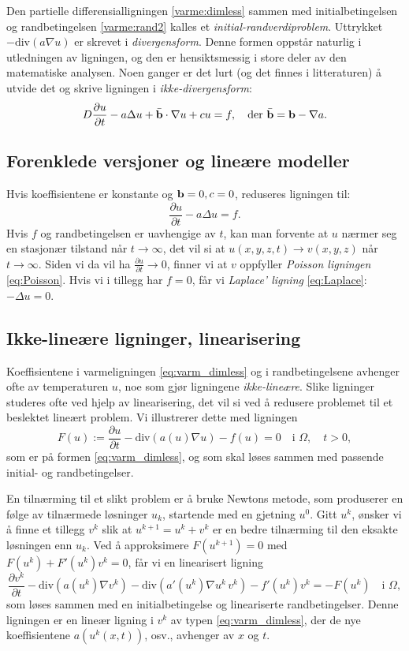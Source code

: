 Den partielle differensialligningen \eqref{varme:dimless} sammen med initialbetingelsen og randbetingelsen \eqref{varme:rand2} kalles et \emph{initial-randverdiproblem}. Uttrykket \( -\text{div} (a \nabla u) \) er skrevet i \emph{divergensform}. Denne formen oppstår naturlig i utledningen av ligningen, og den er hensiktsmessig i store deler av den matematiske analysen. Noen ganger er det lurt (og det finnes i litteraturen) å utvide det og skrive ligningen i \emph{ikke-divergensform}:
\[
D \frac{\partial u}{\partial t} - a \Delta u + \bar{\mathbf{b}} \cdot \nabla u + c u = f, \quad \text{der } \bar{\mathbf{b}} = \mathbf{b} - \nabla a.
\]

\subsection*{Forenklede versjoner og lineære modeller}
Hvis koeffisientene er konstante og \( \mathbf{b} = 0, c = 0 \), reduseres ligningen til:
\[
\frac{\partial u}{\partial t} - a \Delta u = f.
\]
Hvis \( f \) og randbetingelsen er uavhengige av \( t \), kan man forvente at \( u \) nærmer seg en stasjonær tilstand når \( t \to \infty \), det vil si at \( u(x,y,z, t) \to v(x,y,z) \) når \( t \to \infty \).  
Siden vi da vil ha \( \frac{\partial u}{\partial t} \to 0 \), finner vi at \( v \) oppfyller \emph{Poisson ligningen} \eqref{eq:Poisson}.  
Hvis vi i tillegg har \( f = 0 \), får vi \emph{Laplace' ligning} \eqref{eq:Laplace}: $-\Delta u=0$.

\subsection*{Ikke-lineære ligninger, linearisering}

Koeffisientene i varmeligningen \eqref{eq:varm_dimless} og i randbetingelsene avhenger ofte av temperaturen \( u \), noe som gjør ligningene \emph{ikke-lineære}. Slike ligninger studeres ofte ved hjelp av linearisering,  
det vil si ved å redusere problemet til et beslektet lineært problem.  
Vi illustrerer dette med ligningen
\[
F(u) := \frac{\partial u}{\partial t} - \text{div}\left( a(u) \nabla u \right) - f(u) = 0 \quad \text{i } \Omega, \quad t > 0,
\]
som er på formen \eqref{eq:varm_dimless}, og som skal løses sammen med passende initial- og randbetingelser.  

En tilnærming til et slikt problem er å bruke Newtons metode, som produserer en følge av tilnærmede løsninger \( u_k \),  
startende med en gjetning \( u^0 \). Gitt \( u^k \), ønsker vi å finne et tillegg \( v^k \) slik at \( u^{k+1} = u^k + v^k \)  
er en bedre tilnærming til den eksakte løsningen enn \( u_k \).  
Ved å approksimere \( F(u^{k+1}) = 0 \) med \( F(u^k) + F'(u^k) v^k = 0 \), får vi en linearisert ligning
\[
\frac{\partial v^k}{\partial t} - \text{div}\left( a(u^k) \nabla v^k \right) 
- \text{div}\left( a'(u^k) \nabla u^k \, v^k \right) 
- f'(u^k) v^k = -F(u^k) \quad \text{i } \Omega,
\]
som løses sammen med en initialbetingelse og lineariserte randbetingelser.  Denne ligningen er en lineær ligning i \( v^k \) av typen \eqref{eq:varm_dimless}, der de nye koeffisientene \( a(u^k(x,t)) \), osv., avhenger av \( x \) og \( t \).


